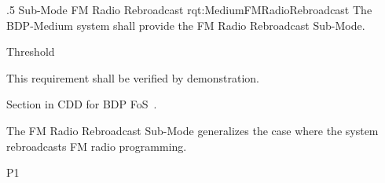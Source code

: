 \ONERQMTVKPP
{\RqtNumberBase.5}
{Sub-Mode FM Radio Rebroadcast}
{rqt:MediumFMRadioRebroadcast}
{The BDP-Medium system shall provide the FM Radio Rebroadcast Sub-Mode.}
{
	\item [Phase 1] Threshold
}
{This requirement shall be verified by demonstration.}
{
\item [5.5.5] Section in CDD for BDP FoS~\cite{ref__BDP_FOS_CDD}.
}
{
	\item The FM Radio Rebroadcast Sub-Mode generalizes the case where the system rebroadcasts FM radio programming.
}
{P1}

